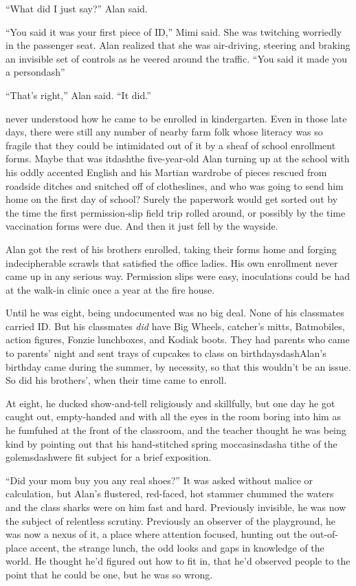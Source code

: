 ``What did I just say?'' Alan said.

``You said it was your first piece of ID,'' Mimi said.  She was
twitching worriedly in the passenger seat.  Alan realized that she was
air-driving, steering and braking an invisible set of controls as he
veered around the traffic.  ``You said it made you a persondash{}''

``That's right,'' Alan said.  ``It did.''

 never understood how he came to be enrolled in kindergarten.  Even
in those late days, there were still any number of nearby farm folk
whose literacy was so fragile that they could be intimidated out of it
by a sheaf of school enrollment forms.  Maybe that was itdash{}the
five-year-old Alan turning up at the school with his oddly accented
English and his Martian wardrobe of pieces rescued from roadside
ditches and snitched off of clotheslines, and who was going to send
him home on the first day of school?  Surely the paperwork would get
sorted out by the time the first permission-slip field trip rolled
around, or possibly by the time vaccination forms were due.  And then
it just fell by the wayside.

Alan got the rest of his brothers enrolled, taking their forms home
and forging indecipherable scrawls that satisfied the office ladies. 
His own enrollment never came up in any serious way.  Permission slips
were easy, inoculations could be had at the walk-in clinic once a year
at the fire house.

Until he was eight, being undocumented was no big deal.  None of his
classmates carried ID.  But his classmates \textit{did} have Big
Wheels, catcher's mitts, Batmobiles, action figures, Fonzie
lunchboxes, and Kodiak boots.  They had parents who came to parents'
night and sent trays of cupcakes to class on birthdaysdash{}Alan's
birthday came during the summer, by necessity, so that this wouldn't
be an issue.  So did his brothers', when their time came to enroll.

At eight, he ducked show-and-tell religiously and skillfully, but one
day he got caught out, empty-handed and with all the eyes in the room
boring into him as he fumfuhed at the front of the classroom, and the
teacher thought he was being kind by pointing out that his
hand-stitched spring moccasinsdash{}a tithe of the golemsdash{}were fit
subject for a brief exposition.

``Did your mom buy you any real shoes?'' It was asked without malice
or calculation, but Alan's flustered, red-faced, hot stammer chummed
the waters and the class sharks were on him fast and hard.  Previously
invisible, he was now the subject of relentless scrutiny.  Previously
an observer of the playground, he was now a nexus of it, a place where
attention focused, hunting out the out-of-place accent, the strange
lunch, the odd looks and gaps in knowledge of the world.  He thought
he'd figured out how to fit in, that he'd observed people to the point
that he could be one, but he was so wrong.

